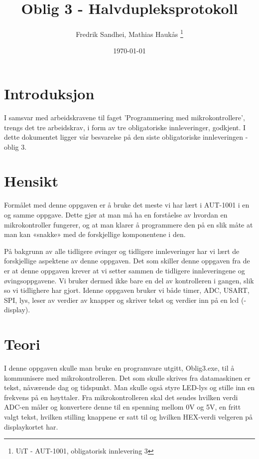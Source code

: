 \documentclass[12pt, a4paper]{report}
\begin{document}
\title{Oblig 3 - Halvdupleksprotokoll}
\author{Fredrik Sandhei, Mathias Haukås \thanks{UiT - AUT-1001, obligatorisk innlevering 3}}
\date{\today}
\maketitle
\newpage
\tableofcontents
\newpage

\section{Introduksjon}
I samsvar med arbeidskravene til faget 'Programmering med mikrokontrollere', trengs det tre arbeidskrav, i form av tre obligatoriske innleveringer, godkjent. I dette dokumentet ligger vår besvarelse på den siste obligatoriske innleveringen - oblig 3. 

\section{Hensikt}

Formålet med denne oppgaven er å bruke det meste vi har lært i AUT-1001 i en og samme oppgave. Dette gjør at man må ha en forståelse av hvordan en mikrokontroller fungerer, og at man klarer å programmere den på en slik måte at man kan «snakke» med de forskjellige komponentene i den.


På bakgrunn av alle tidligere øvinger og tidligere innleveringer har vi lært de forskjellige aspektene av denne oppgaven. Det som skiller denne oppgaven fra de er at denne oppgaven krever at vi setter sammen de tidligere innleveringene og øvingsoppgavene. Vi bruker dermed ikke bare en del av kontrolleren i gangen, slik so vi tidlighere har gjort.  Idenne oppgaven bruker vi både timer, ADC, USART, SPI, lys, leser av verdier av knapper og skriver tekst og verdier inn på en lcd (-display).


\section{Teori}
I denne oppgaven skulle man bruke en programvare utgitt, Oblig3.exe, til å kommunisere med mikrokontrolleren. Det som skulle skrives fra datamaskinen er tekst, nåværende dag og tidspunkt. Man skulle også styre LED-lys og stille inn en frekvens på en høyttaler.
Fra mikrokontrolleren skal det sendes hvilken verdi ADC-en måler og konvertere denne til en spenning mellom 0V og 5V, en fritt valgt tekst, hvilken stilling knappene er satt til og hvilken HEX-verdi velgeren på displaykortet har.
\end{document}
